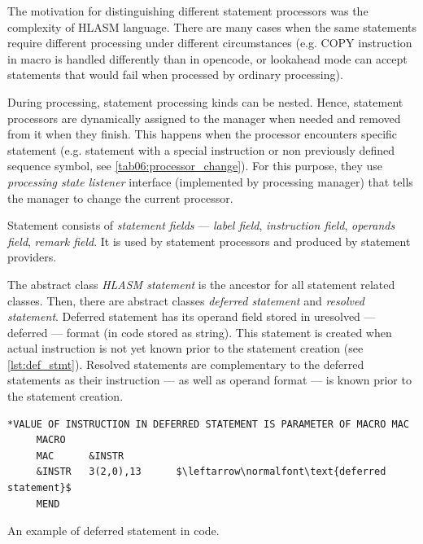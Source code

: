 The motivation for distinguishing different statement processors was the complexity of HLASM language. There are many cases when the same statements require different processing under different circumstances (e.g. COPY instruction in macro is handled differently than in opencode, or lookahead mode can accept statements that would fail when processed by ordinary processing).

During processing, statement processing kinds can be nested. Hence, statement processors are dynamically assigned to the manager when needed and removed from it when they finish. This happens when the processor encounters specific statement (e.g. statement with a special instruction or non previously defined sequence symbol, see \cref{tab06:processor_change}). For this purpose, they use \emph{processing state listener} interface (implemented by processing manager) that tells the manager to change the current processor.

Statement consists of \emph{statement fields} --- \emph{label field}, \emph{instruction field}, \emph{operands field}, \emph{remark field}. It is used by statement processors and produced by statement providers. 

The abstract class \emph{HLASM statement} is the ancestor for all statement related classes. Then, there are abstract classes \emph{deferred statement} and \emph{resolved statement}. Deferred statement has its operand field stored in uresolved --- deferred --- format (in code stored as string). This statement is created when actual instruction is not yet known prior to the statement creation (see \cref{lst:def_stmt}). Resolved statements are complementary to the deferred statements as their instruction --- as well as operand format --- is known prior to the statement creation.

\begin{listing}[t]
	\begin{Verbatim}[commandchars=\\\{\},codes={\catcode`$=3}]
*VALUE OF INSTRUCTION IN DEFERRED STATEMENT IS PARAMETER OF MACRO MAC
     MACRO
     MAC      &INSTR
     &INSTR   3(2,0),13      $\leftarrow\normalfont\text{deferred statement}$
     MEND
	\end{Verbatim}
	\caption{An example of deferred statement in code.}
	\label{lst:def_stmt}
\end{listing}




